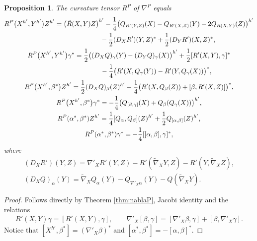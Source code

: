 \documentclass[pdftex]{sigma}
\numberwithin{equation}{section}
\newtheorem{Proposition}[Theorem]{Proposition}
\begin{document}
\begin{Proposition}\label{prop:RP}
The curvature tensor $R^P$ of $\nabla^P$ equals
\begin{gather*}
R^P\big(X^{h'},Y^{h'}\big)Z^{h'} =\big(\tilde{R}(X,Y)Z\big)^{h'}-\frac{1}{4}\big( Q_{R'(Y,Z)}(X)-Q_{R'(X,Z)}(Y)-2Q_{R(X,Y)}(Z)\big)^{h'}\\
\hphantom{R^P\big(X^{h'},Y^{h'}\big)Z^{h'} =}{}-\frac{1}{2}(D_XR')(Y,Z)^{\ast}+\frac{1}{2}(D_YR')(X,Z)^{\ast},\\
R^P\big(X^{h'},Y^{h'}\big)\gamma^{\ast} =\frac{1}{2}\big((D_XQ)_{\gamma}(Y)-(D_YQ)_{\gamma}(X)\big)^{h'}+\frac{1}{2}[R'(X,Y),\gamma]^{\ast}\\
\hphantom{R^P\big(X^{h'},Y^{h'}\big)\gamma^{\ast} =}{}
-\frac{1}{4}\big( R'(X,Q_{\gamma}(Y))-R'(Y,Q_{\gamma}(X)) \big)^{\ast},\\
R^P\big(X^{h'},\beta^{\ast}\big)Z^{h'} =\frac{1}{2}(D_XQ)_{\beta}(Z)^{h'}-\frac{1}{4}\big( R'(X,Q_{\beta}(Z))+[\beta,R'(X,Z)] \big)^{\ast},\\
R^P\big(X^{h'},\beta^{\ast}\big)\gamma^{\ast} =-\frac{1}{4}\big( Q_{[\beta,\gamma]}(X)+Q_{\beta}(Q_{\gamma}(X)) \big)^{h'},\\
R^P(\alpha^{\ast},\beta^{\ast})Z^{h'} =\frac{1}{4}[Q_{\alpha},Q_{\beta}](Z)^{h'}+\frac{1}{2}Q_{[\alpha,\beta]}(Z)^{h'},\\
R^P(\alpha^{\ast},\beta^{\ast})\gamma^{\ast} =-\frac{1}{4}[[\alpha,\beta],\gamma]^{\ast},
\end{gather*}
where
\begin{gather*}
(D_XR')(Y,Z) =\nabla '_XR'(Y,Z)-R'(\tilde{\nabla}_XY,Z)-R'(Y,\tilde{\nabla}_XZ),\\
(D_XQ)_{\alpha}(Y) =\tilde{\nabla}_XQ_{\alpha}(Y)-Q_{\nabla '_X\alpha}(Y)-Q(\tilde{\nabla}_XY).
\end{gather*}
\end{Proposition}
\begin{proof}
Follows directly by Theorem \ref{thm:nablaP}, Jacobi identity and the relations
\begin{gather*}
R'(X,Y)\gamma=[R'(X,Y),\gamma],\qquad \nabla '_X[\beta,\gamma]=[\nabla '_X\beta,\gamma]+[\beta,\nabla '_X\gamma].
\end{gather*}
Notice that $[X^{h'},\beta^{\ast}]=(\nabla '_X\beta)^{\ast}$ and $[\alpha^{\ast},\beta^{\ast}]=-[\alpha,\beta]^{\ast}$.
\end{proof}
\end{document}
